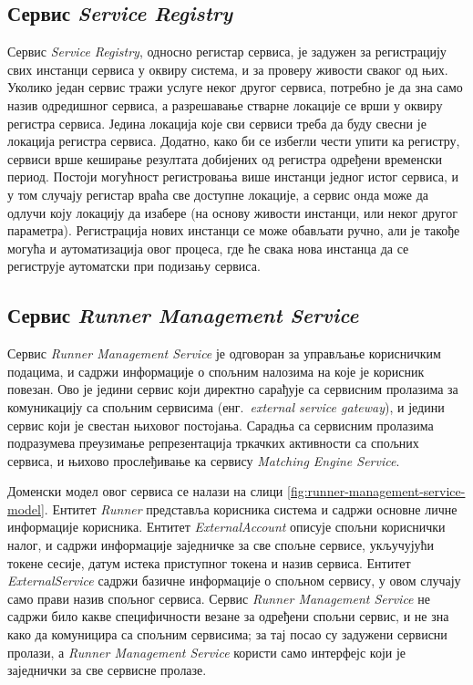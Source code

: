 \documentclass[12pt,oneside]{memoir}
\begin{document}
\subsection{Сервис \textit{Service Registry}}
Сервис \textit{Service Registry}, односно регистар сервиса, је задужен за регистрацију свих инстанци сервиса у оквиру система, и за проверу живости сваког од њих. Уколико један сервис тражи услуге неког другог сервиса, потребно је да зна само назив одредишног сервиса, а разрешавање стварне локације се врши у оквиру регистра сервиса. Једина локација које сви сервиси треба да буду свесни је локација регистра сервиса. Додатно, како би се избегли чести упити ка регистру, сервиси врше кеширање резултата добијених од регистра одређени временски период. Постоји могућност регистровања више инстанци једног истог сервиса, и у том случају регистар враћа све доступне локације, а сервис онда може да одлучи коју локацију да изабере (на основу живости инстанци, или неког другог параметра). Регистрација нових инстанци се може обављати ручно, али је такође могућа и аутоматизација овог процеса, где ће свака нова инстанца да се региструје аутоматски при подизању сервиса.

\subsection{Сервис \textit{Runner Management Service}}
Сервис \textit{Runner Management Service} је одговоран за управљање корисничким подацима, и садржи информације о спољним налозима на које је корисник повезан. Ово је једини сервис који директно сарађује са сервисним пролазима за комуникацију са спољним сервисима (енг.~\textit{external service gateway}), и једини сервис који је свестан њиховог постојања. Сарадња са сервисним пролазима подразумева преузимање репрезентација тркачких активности са спољних сервиса, и њихово прослеђивање ка сервису \textit{Matching Engine Service}.

Доменски модел овог сервиса се налази на слици \ref{fig:runner-management-service-model}. Ентитет \textit{Runner} представља корисника система и садржи основне личне информације корисника. Ентитет \textit{ExternalAccount} описује спољни кориснички налог, и садржи информације заједничке за све спољне сервисе, укључујући токене сесије, датум истека приступног токена и назив сервиса. Ентитет \textit{ExternalService} садржи базичне информације о спољном сервису, у овом случају само прави назив спољног сервиса. Сервис \textit{Runner Management Service} не садржи било какве специфичности везане за одређени спољни сервис, и не зна како да комуницира са спољним сервисима; за тај посао су задужени сервисни пролази, а \textit{Runner Management Service} користи само интерфејс који је заједнички за све сервисне пролазе.
\end{document}
